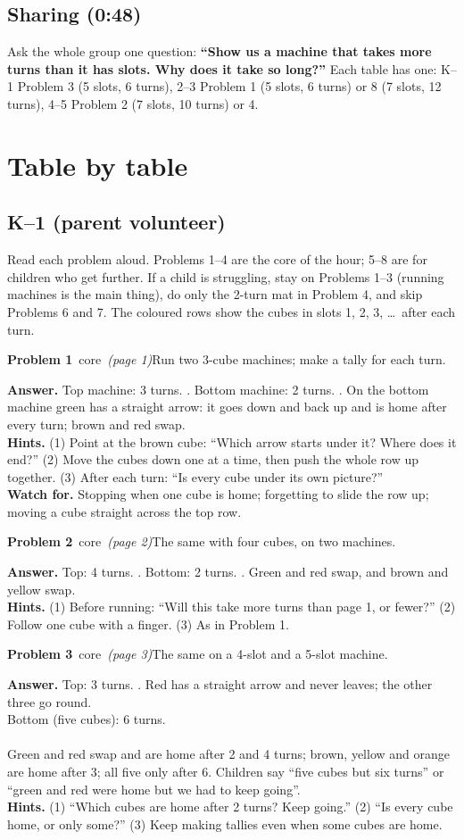\documentclass[11pt,letterpaper]{extarticle}
\newcommand{\core}{\textsf{\small\colorbox{shade}{core}}}
\newcommand{\prob}[4]{\par\needspace{6\baselineskip}\vspace{5pt}\textbf{Problem #1} \,#2\, \textit{(#3)}\hspace{0.5em}#4\par}
\newcommand{\ans}{\textbf{Answer.} }
\newcommand{\hints}{\textbf{Hints.} }
\newcommand{\watch}{\textbf{Watch for.} }
\begin{document}
\subsection{Sharing (0:48)}
Ask the whole group one question: \textbf{``Show us a machine that takes more turns than it has slots. Why does it take so long?''} Each table has one: K--1 Problem 3 (5 slots, 6 turns), 2--3 Problem 1 (5 slots, 6 turns) or 8 (7 slots, 12 turns), 4--5 Problem 2 (7 slots, 10 turns) or 4.

\section{Table by table}

\subsection{K--1 (parent volunteer)}
Read each problem aloud. Problems 1--4 are the core of the hour; 5--8 are for children who get further. If a child is struggling, stay on Problems 1--3 (running machines is the main thing), do only the 2-turn mat in Problem 4, and skip Problems 6 and 7. The coloured rows show the cubes in slots 1, 2, 3, \dots\ after each turn.

\prob{1}{\core}{page 1}{Run two 3-cube machines; make a tally for each turn.}
\ans Top machine: 3 turns. \KoneA. Bottom machine: 2 turns. \KoneB. On the bottom machine green has a straight arrow: it goes down and back up and is home after every turn; brown and red swap.\\
\hints (1) Point at the brown cube: ``Which arrow starts under it? Where does it end?'' (2) Move the cubes down one at a time, then push the whole row up together. (3) After each turn: ``Is every cube under its own picture?''\\
\watch Stopping when one cube is home; forgetting to slide the row up; moving a cube straight across the top row.

\prob{2}{\core}{page 2}{The same with four cubes, on two machines.}
\ans Top: 4 turns. \KtwoA. Bottom: 2 turns. \KtwoB. Green and red swap, and brown and yellow swap.\\
\hints (1) Before running: ``Will this take more turns than page 1, or fewer?'' (2) Follow one cube with a finger. (3) As in Problem 1.

\prob{3}{\core}{page 3}{The same on a 4-slot and a 5-slot machine.}
\ans Top: 3 turns. \KthreeA. Red has a straight arrow and never leaves; the other three go round.\\
Bottom (five cubes): 6 turns.\\
\KthreeB\\
Green and red swap and are home after 2 and 4 turns; brown, yellow and orange are home after 3; all five only after 6. Children say ``five cubes but six turns'' or ``green and red were home but we had to keep going''.\\
\hints (1) ``Which cubes are home after 2 turns? Keep going.'' (2) ``Is every cube home, or only some?'' (3) Keep making tallies even when some cubes are home.
\end{document}
